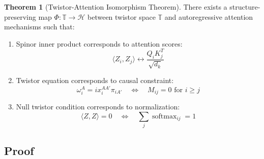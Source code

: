 \documentclass[12pt,a4paper]{article}
\theoremstyle{definition}
\newtheorem{theorem}{Theorem}[section]
\DeclareMathOperator{\softmax}{softmax}
\begin{document}
\begin{theorem}[Twistor-Attention Isomorphism Theorem]\label{thm:main}
There exists a structure-preserving map $\Phi: \mathbb{T} \to \mathcal{H}$ between twistor space $\mathbb{T}$ and autoregressive attention mechanisms such that:

\begin{enumerate}
\item Spinor inner product corresponds to attention scores:
\begin{equation}\label{eq:corr1}
\langle Z_i, Z_j \rangle \longleftrightarrow \frac{Q_i K_j^T}{\sqrt{d_k}}
\end{equation}

\item Twistor equation corresponds to causal constraint:
\begin{equation}\label{eq:corr2}
\omega_i^A = i x_i^{AA'} \pi_{iA'} \quad \Longleftrightarrow \quad M_{ij} = 0 \text{ for } i \geq j
\end{equation}

\item Null twistor condition corresponds to normalization:
\begin{equation}\label{eq:corr3}
\langle Z, Z \rangle = 0 \quad \Longleftrightarrow \quad \sum_j \softmax_{ij} = 1
\end{equation}
\end{enumerate}
\end{theorem}

\subsection{Proof}
\end{document}
